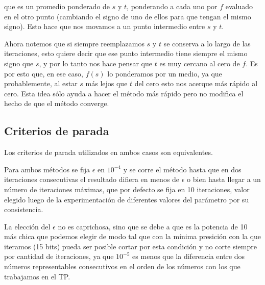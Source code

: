 que es un promedio ponderado de $s$ y $t$, ponderando a cada uno por $f$ 
evaluado en el otro punto (cambiando el signo de uno de ellos para que 
tengan el mismo signo). Esto hace que nos movamos a un punto intermedio 
entre $s$ y $t$.

Ahora notemos que si siempre reemplazamos $s$ y $t$ se conserva a lo largo 
de las iteraciones, esto quiere decir que ese punto intermedio tiene siempre el 
mismo signo que $s$, y por lo tanto nos hace pensar que $t$ es muy cercano al 
cero de $f$. Es por esto que, en ese caso, $f(s)$ lo ponderamos por un medio, 
ya que probablemente, al estar $s$ m\'as lejos que $t$ del cero esto nos 
acerque m\'as r\'apido al cero. Esta idea s\'olo ayuda a hacer el 
m\'etodo m\'as r\'apido pero no modifica el hecho de que el m\'etodo converge.

\subsection{Criterios de parada}	

Los criterios de parada utilizados en ambos casos son equivalentes.

Para ambos m\'etodos se fija $\epsilon$ en $10^{-4}$ y se corre el m\'etodo 
hasta que en dos iteraciones consecutivas el resultado difiera en menos de 
$\epsilon$ o bien hasta llegar a un n\'umero de iteraciones m\'aximas, 
que por defecto se fija en 10 iteraciones, valor elegido luego de la 
experimentaci\'on de diferentes valores del par\'ametro por su consistencia.

La elecci\'on del $\epsilon$ no es caprichosa, sino que se debe a que es la 
potencia de 10 m\'as chica que podemos elegir de modo tal que con la m\'inima 
presici\'on con la que iteramos (15 bits) pueda ser posible cortar por esta 
condici\'on y no corte siempre por cantidad de iteraciones, ya que 
$10^{-5}$ es menos que la diferencia entre dos n\'umeros representables 
consecutivos en el orden de los n\'umeros con los que trabajamos en el TP.
